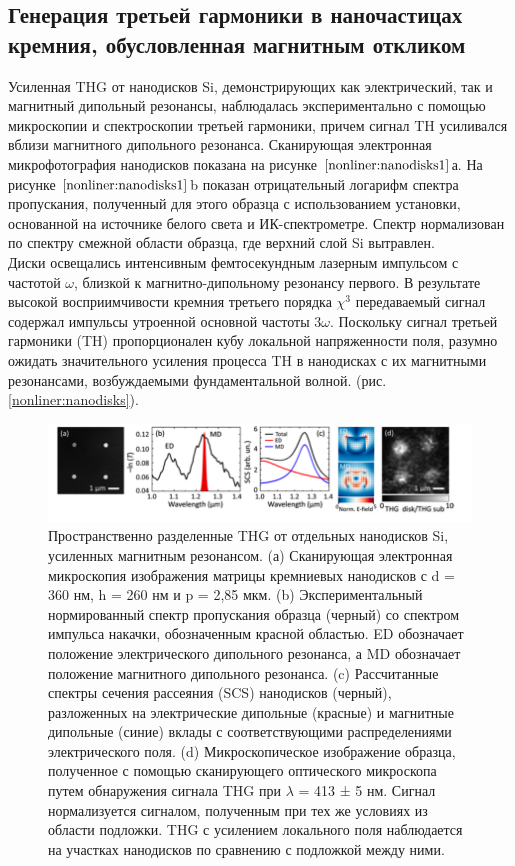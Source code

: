 \subsection*{Генерация третьей гармоники в наночастицах кремния, обусловленная магнитным откликом}
\hspace*{2mm}Усиленная THG от нанодисков Si, демонстрирующих как электрический, так и магнитный дипольный резонансы, наблюдалась экспериментально \cite{enhTHGnano} с помощью микроскопии и спектроскопии третьей гармоники, причем сигнал TH усиливался вблизи магнитного дипольного резонанса. Сканирующая электронная микрофотография нанодисков показана на рисунке $\ref{nonliner:nanodisks1}$а. На рисунке $\ref{nonliner:nanodisks1}$b показан отрицательный логарифм спектра пропускания, полученный для этого образца с использованием установки, основанной на источнике белого света и ИК-спектрометре. Спектр нормализован по спектру смежной области образца, где верхний слой Si вытравлен. 
\\
\hspace*{2mm}
Диски освещались интенсивным фемтосекундным лазерным импульсом с частотой $\omega$, близкой к магнитно-дипольному резонансу первого. В результате высокой восприимчивости кремния третьего порядка $\chi^3$ передаваемый сигнал содержал импульсы утроенной основной частоты $3\omega$. Поскольку сигнал третьей гармоники (TH) пропорционален кубу локальной напряженности поля, разумно ожидать значительного усиления процесса TH в нанодисках с их магнитными резонансами, возбуждаемыми фундаментальной волной. (рис. \ref{nonliner:nanodisks}). 
  \begin{figure}[h!]
	\centering
	\includegraphics[width=1\linewidth]{images/fig4.png}
	\caption{Пространственно разделенные THG от отдельных нанодисков Si, усиленных магнитным резонансом. (а) Сканирующая электронная микроскопия изображения матрицы кремниевых нанодисков с d = 360 нм, h = 260 нм и p = 2,85 мкм. (b) Экспериментальный нормированный спектр пропускания образца (черный) со спектром импульса накачки, обозначенным красной областью. ED обозначает положение электрического дипольного резонанса, а MD обозначает положение магнитного дипольного резонанса. (c) Рассчитанные спектры сечения рассеяния (SCS) нанодисков (черный), разложенных на электрические дипольные (красные) и магнитные дипольные (синие) вклады с соответствующими распределениями электрического поля. (d) Микроскопическое изображение образца, полученное с помощью сканирующего оптического микроскопа путем обнаружения сигнала THG при $\lambda$ = 413 ± 5 нм. Сигнал нормализуется сигналом, полученным при тех же условиях из области подложки. THG с усилением локального поля наблюдается на участках нанодисков по сравнению с подложкой между ними.}
	\label{nonliner:nanodisks1}
\end{figure}
